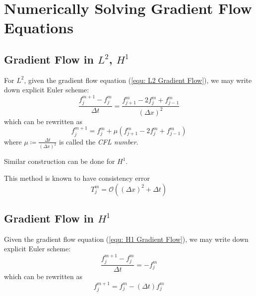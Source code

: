 \documentclass[a4paper]{article}
\theoremstyle{definition}
\begin{document}
\section{Numerically Solving Gradient Flow Equations}
\subsection{Gradient Flow in $L^2$, $H^1$}
For $L^2$, given the gradient flow equation (\ref{equ: L2 Gradient Flow}),
we may write down explicit Euler scheme:
\begin{equation}
    \frac{f_j^{m+1} - f_j^m}{\Delta t} = \frac{f_{j+1}^m - 2 f_{j}^m + f_{j-1}^m}{(\Delta x)^2}
    \label{equ: L2 Numeric}
\end{equation}
which can be rewritten as
\begin{equation}
    f_{j}^{m+1} = f_j^m + \mu \left( f_{j+1}^m - 2 f_{j}^m + f_{j-1}^m \right)
\end{equation}
where $\mu \coloneqq \frac{\Delta t}{(\Delta x)^2}$ is called the \emph{CFL number}.

Similar construction can be done for $H^1$.

This method is known to have consistency error
\begin{equation}
    T_j^m = \mathcal{O}\left( \left( \Delta x \right)^2 + \Delta t \right)
    \label{L2 Consistency Error}
\end{equation}

\subsection{Gradient Flow in $H^1$}
Given the gradient flow equation (\ref{equ: H1 Gradient Flow}),
we may write down explicit Euler scheme:
\begin{equation}
    \frac{f_j^{m+1} - f_j^m}{\Delta t} = -f_{j}^m
    \label{equ: H1 Numeric}
\end{equation}
which can be rewritten as
\begin{equation}
    f_j^{m+1} = f_j^m - (\Delta t)f_j^m
\end{equation}

\end{document}
